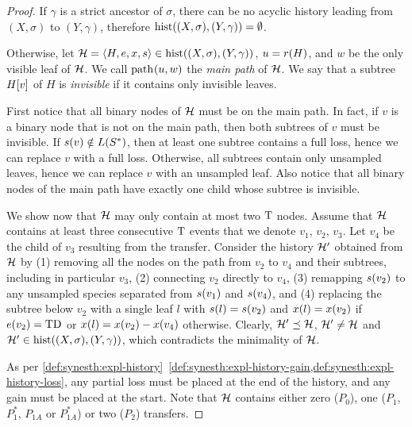 \begin{proof}
    If \(\gamma\) is a strict ancestor of \(\sigma\), there can be no acyclic history leading from \((X, \sigma)\) to \((Y, \gamma)\), therefore \(\mathrm{hist}((X, \sigma), (Y, \gamma)) = \emptyset\).

    Otherwise, let \(\mathcal{H} = \left\langle H, e, x, s\right\rangle \in \mathrm{hist}((X, \sigma), (Y, \gamma))\), \(u = r(H)\), and \(w\) be the only visible leaf of \(\mathcal{H}\).
    We call \(\mathrm{path}_{}(u, w)\) the \emph{main path} of \(\mathcal{H}\).
    We say that a subtree \(H[v]\) of \(H\) is \emph{invisible} if it contains only invisible leaves.

    First notice that all binary nodes of \(\mathcal{H}\) must be on the main path.
    In fact, if \(v\) is a binary node that is not on the main path, then both subtrees of \(v\) must be invisible.
    If \(s(v) \notin L(S^*)\), then at least one subtree contains a full loss, hence we can replace \(v\) with a full loss.
    Otherwise, all subtrees contain only unsampled leaves, hence we can replace \(v\) with an unsampled leaf.
    Also notice that all binary nodes of the main path have exactly one child whose subtree is invisible.

    We show now that \(\mathcal{H}\)
    may only contain at most two \(\mathrm{T}\) nodes.
    Assume that \(\mathcal{H}\) contains at least three consecutive \(\mathrm{T}\) events that we denote \(v_1\), \(v_2\), \(v_3\).
    Let \(v_4\) be the child of \(v_3\) resulting from the transfer.
    Consider the history \(\mathcal{H}'\) obtained from \(\mathcal{H}\) by
    (1) removing all the nodes on the path from \(v_2\) to \(v_4\) and their subtrees, including in particular \(v_3\),
    (2) connecting \(v_2\) directly to \(v_4\),
    (3) remapping \(s(v_2)\) to any unsampled species separated from \(s(v_1)\) and \(s(v_4)\), and
    (4) replacing the subtree below \(v_2\) with a single leaf \(l\) with \(s(l) = s(v_2)\) and \(x(l) = x(v_2)\) if \(e(v_2) = \mathrm{TD}\) or \(x(l) = x(v_2) - x(v_4)\) otherwise.
    Clearly, \(\mathcal{H}' \preceq \mathcal{H}\), \(\mathcal{H}' \neq \mathcal{H}\) and \(\mathcal{H}' \in \mathrm{hist}((X, \sigma), (Y, \gamma))\), which contradicts the minimality of \(\mathcal{H}\).

    As per \cref{def:synesth:expl-history}~\cref{def:synesth:expl-history-gain,def:synesth:expl-history-loss}, any partial loss must be placed at the end of the history, and any gain must be placed at the start.
    Note that \(\mathcal{H}\) contains either zero (\(P_0\)), one (\(P_1\), \(P_1^*\), \(P_{1A}\) or \(P_{1A}^*\)) or two (\(P_2\)) transfers.


\end{proof}
